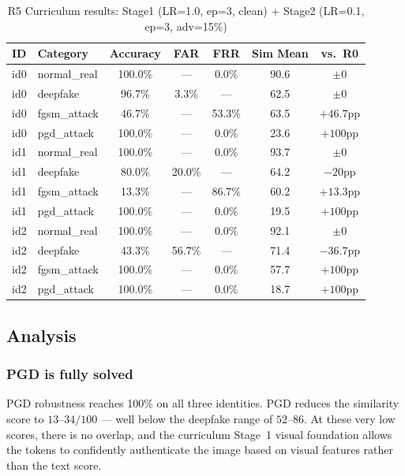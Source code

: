\documentclass[12pt,a4paper]{article}
\begin{document}
\begin{table}[H]
\centering
\caption{R5 Curriculum results: Stage1 (LR=1.0, ep=3, clean) + Stage2 (LR=0.1, ep=3, adv=15\%)}
\label{tab:r5}
\begin{tabular}{@{}llccccc@{}}
\toprule
\textbf{ID} & \textbf{Category} & \textbf{Accuracy} & \textbf{FAR} & \textbf{FRR} & \textbf{Sim Mean} & \textbf{vs.\ R0} \\
\midrule
id0 & normal\_real  & 100.0\% & ---    & 0.0\%  & 90.6 & $\pm 0$      \\
id0 & deepfake      &  96.7\% & 3.3\%  & ---    & 62.5 & $\pm 0$      \\
id0 & fgsm\_attack  &  46.7\% & ---    & 53.3\% & 63.5 & $+46.7$pp   \\
id0 & pgd\_attack   & 100.0\% & ---    & 0.0\%  & 23.6 & $+100$pp    \\
\midrule
id1 & normal\_real  & 100.0\% & ---    & 0.0\%  & 93.7 & $\pm 0$      \\
id1 & deepfake      &  80.0\% & 20.0\% & ---    & 64.2 & $-20$pp     \\
id1 & fgsm\_attack  &  13.3\% & ---    & 86.7\% & 60.2 & $+13.3$pp   \\
id1 & pgd\_attack   & 100.0\% & ---    & 0.0\%  & 19.5 & $+100$pp    \\
\midrule
id2 & normal\_real  & 100.0\% & ---    & 0.0\%  & 92.1 & $\pm 0$      \\
id2 & deepfake      &  43.3\% & 56.7\% & ---    & 71.4 & $-36.7$pp   \\
id2 & fgsm\_attack  & 100.0\% & ---    & 0.0\%  & 57.7 & $+100$pp    \\
id2 & pgd\_attack   & 100.0\% & ---    & 0.0\%  & 18.7 & $+100$pp    \\
\bottomrule
\end{tabular}
\end{table}

\subsection{Analysis}

\subsubsection*{PGD is fully solved}

PGD robustness reaches 100\% on all three identities.  PGD reduces the
similarity score to $13$--$34/100$ --- well below the deepfake range of
$52$--$86$.  At these very low scores, there is no overlap, and the curriculum
Stage~1 visual foundation allows the tokens to confidently authenticate the
image based on visual features rather than the text score.
\end{document}
